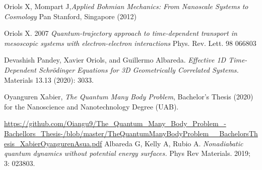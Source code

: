 \documentclass[11pt, a4paper]{article} %
\begin{document}
\begin{thebibliography}{1}

	Oriols X, Mompart J,{\em Applied Bohmian Mechanics: From Nanoscale Systems to Cosmology} Pan Stanford, Singapore (2012)
	
	Oriols X. 2007 {\em Quantum-trajectory approach to time-dependent transport in mesoscopic systems with electron-electron interactions} Phys. Rev. Lett. 98 066803

	Devashish Pandey, Xavier Oriols, and Guillermo Albareda. {\em Effective 1D Time-Dependent Schrödinger Equations for 3D Geometrically Correlated Systems.} Materials 13.13 (2020): 3033.

	Oyanguren Xabier, {\em The Quantum Many Body Problem}, Bachelor's Thesis (2020) for the Nanoscience and Nanotechnology Degree (UAB).

\href{https://github.com/Oiangu9/The\_Quantum\_Many\_Body\_Problem\_-Bachellors\_Thesis-/blob/master/TheQuantumManyBodyProblem\_\_BachelorsThesis\_XabierOyangurenAsua.pdf}{https://github.com/Oiangu9/The\_Quantum\_Many\_Body\_Problem\_-Bachellors\_Thesis-/blob/master/TheQuantumManyBodyProblem\_\_BachelorsThesis\_XabierOyangurenAsua.pdf}
	Albareda G, Kelly A, Rubio A. {\em Nonadiabatic quantum dynamics without potential energy surfaces.} Phys Rev Materials. 2019; 3: 023803. 

	
\end{thebibliography}
\end{document}
